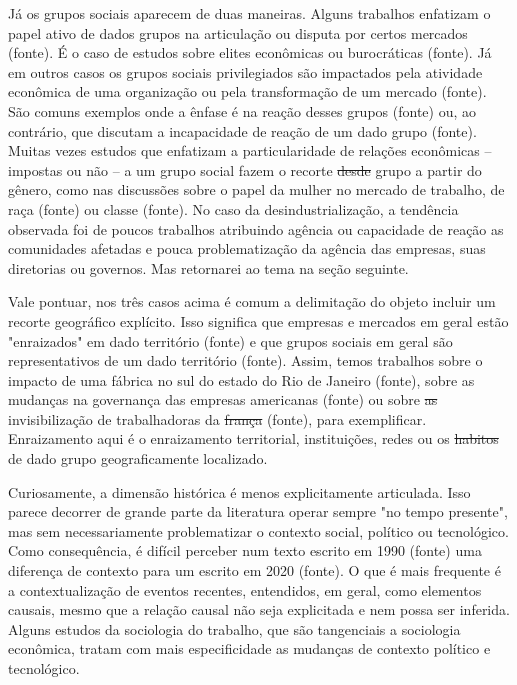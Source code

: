 Já os grupos sociais aparecem de duas maneiras. Alguns trabalhos enfatizam o papel ativo de dados grupos na articulação ou disputa por
certos mercados (fonte). É o caso de estudos sobre elites econômicas ou burocráticas (fonte). Já em outros casos os grupos sociais privilegiados são impactados pela atividade econômica de uma organização ou pela transformação de um mercado (fonte). São comuns exemplos onde a ênfase é na reação desses grupos (fonte) ou, ao contrário, que discutam a incapacidade de reação de um dado grupo (fonte). Muitas vezes estudos que enfatizam a particularidade de relações econômicas --impostas ou não -- a um grupo social fazem o recorte \sout{desde} grupo a partir do gênero, como nas discussões sobre o papel da mulher no mercado de trabalho, de raça (fonte) ou classe (fonte). No caso da desindustrialização, a tendência observada foi de poucos trabalhos atribuindo agência ou capacidade de reação as comunidades afetadas e pouca problematização da agência das empresas, suas diretorias ou governos. Mas retornarei ao tema na seção seguinte.

Vale pontuar, nos três casos acima é comum a delimitação do objeto incluir um recorte geográfico explícito. Isso significa que empresas e mercados em geral estão "enraizados" em dado território (fonte) e que grupos sociais em geral são representativos de um dado território (fonte). Assim, temos trabalhos sobre o impacto de uma fábrica no sul do estado do Rio de Janeiro (fonte), sobre as mudanças na governança das empresas americanas (fonte) ou sobre \sout{as} invisibilização de trabalhadoras da \sout{frança} (fonte), para exemplificar. Enraizamento aqui é o enraizamento territorial, instituições, redes ou os \sout{habitos} de dado grupo geograficamente localizado.

Curiosamente, a dimensão histórica é menos explicitamente articulada. Isso parece decorrer de grande parte da literatura operar sempre "no tempo presente", mas sem necessariamente problematizar o contexto social, político ou tecnológico. Como consequência, é difícil perceber num texto escrito em 1990 (fonte) uma diferença de contexto para um escrito em 2020 (fonte). O que é mais frequente é a contextualização de eventos recentes, entendidos, em geral, como elementos causais, mesmo que a relação causal não seja explicitada e nem possa ser inferida. Alguns estudos da sociologia do trabalho, que são tangenciais a sociologia econômica, tratam com mais especificidade as
mudanças de contexto político e tecnológico.

